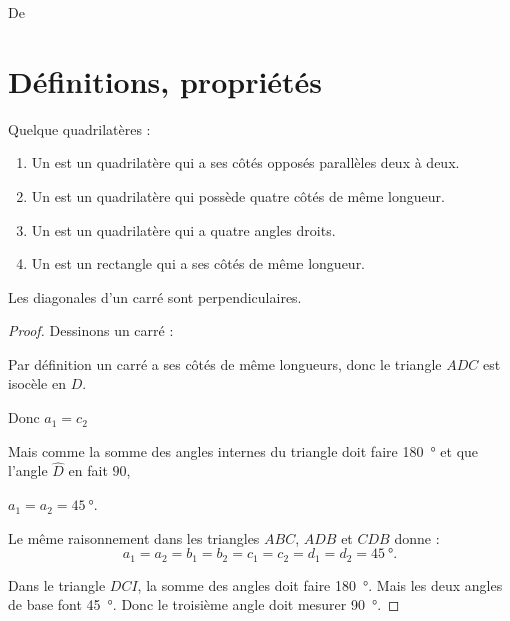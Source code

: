 

De \cite{NRHooXFvgpp5}

\section{Définitions, propriétés}

\begin{definition}
    Quelque quadrilatères :
    \begin{enumerate}
        \item
            Un  est un quadrilatère qui a ses côtés opposés parallèles deux à deux.
        \item
            Un  est un quadrilatère qui possède quatre côtés de même longueur.
        \item
            Un  est un quadrilatère qui a quatre angles droits.
        \item
            Un  est un rectangle qui a ses côtés de même longueur.
    \end{enumerate}
\end{definition}

\begin{propriete}
    Les diagonales d'un carré sont perpendiculaires.
\end{propriete}

\begin{proof}
    Dessinons un carré :
    \begin{center}
        
    \end{center}
    Par définition un carré a ses côtés de même longueurs, donc le triangle \( ADC\) est isocèle en \( D\).
    \begin{center}
        Donc \( a_1=c_2\)
    \end{center}
    Mais comme la somme des angles internes du triangle doit faire \SI{180}{\degree} et que l'angle \( \hat D\) en fait \( 90\), 
    \begin{center}
        \( a_1=a_2=\SI{45}{\degree}\).
    \end{center}
    Le même raisonnement dans les triangles \( ABC\), \( ADB\) et \( CDB\) donne :
    \begin{equation}
        a_1=a_2=b_1=b_2=c_1=c_2=d_1=d_2=\SI{45}{\degree}.
    \end{equation}
    
    Dans le triangle \( DCI\), la somme des angles doit faire \SI{180}{\degree}. Mais les deux angles de base font \SI{45}{\degree}. Donc le troisième angle doit mesurer \SI{90}{\degree}.

\end{proof}

